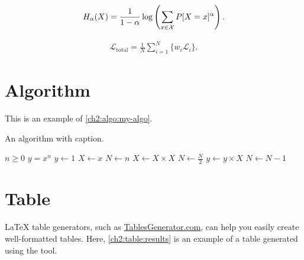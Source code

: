 \begin{equation}
\label{ch2:eq:renyi}
H_{\alpha}(X) =
\frac{1}{1-\alpha}
\log \left(\sum_{x \in {\cal X}}P[X=x]^{\alpha} \right) .
\end{equation}

\begin{equation} 
\label{ch2:eq:total-loss}
\begin{aligned}
\mathcal{L}_{\textrm{total}} = \frac{1}{N}\sum_{i=1}^{N}\{w_i\mathcal{L}_i\}. 
\end{aligned}
\end{equation}


\section{Algorithm}

\begin{paragraph}
This is an example of \autoref{ch2:algo:my-algo}.
\end{paragraph}

\begin{algorithm}[h]
\caption{An algorithm with caption.}
\label{ch2:algo:my-algo}
\normalsize\singlespacing
\begin{algorithmic}[1] %
    \Require $n \geq 0$
    \Ensure $y = x^n$
    \State $y \gets 1$
    \State $X \gets x$
    \State $N \gets n$
        \State $X \gets X \times X$
        \State $N \gets \frac{N}{2}$  
        \State $y \gets y \times X$
        \State $N \gets N - 1$
    \EndIf
    \EndWhile
\end{algorithmic}
\end{algorithm}



\section{Table}

\begin{paragraph}
LaTeX table generators, such as \href{https://www.tablesgenerator.com/}{TablesGenerator.com}\footnotemark{}, can help you easily create well-formatted tables. 
Here, \autoref{ch2:table:results} is an example of a table generated using the tool.
\end{paragraph}
    

